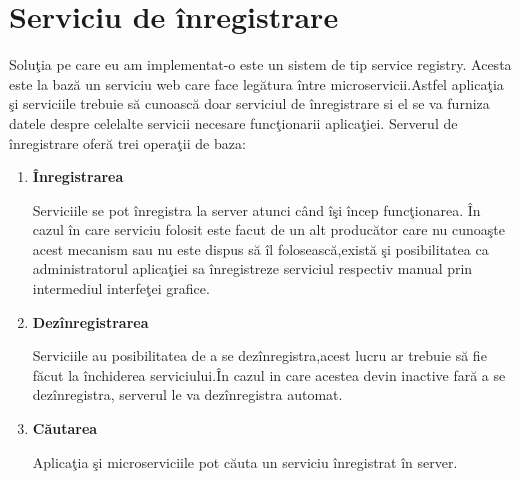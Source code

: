 \documentclass[a4paper,12pt]{report}
\begin{document}
\section{Serviciu de \^inregistrare}
Solu\c tia pe care eu am implementat-o este un sistem de tip service registry.
Acesta este la baz\u a un serviciu web care face leg\u atura \^intre microservicii.Astfel aplica\c tia \c si serviciile trebuie 
s\u a cunoasc\u a doar serviciul de \^inregistrare si el se va furniza datele despre celelalte servicii necesare func\c tionarii aplica\c tiei. 
Serverul de \^ inregistrare ofer\u a trei opera\c tii de baza:
\begin{enumerate}
	\item \textbf{\^Inregistrarea}
	
			Serviciile se pot \^inregistra la server atunci c\^and \^i\c si \^incep func\c tionarea.
			\^In cazul \^in care serviciu folosit este facut de un alt produc\u ator care nu cunoa\c ste acest 
			mecanism sau nu este dispus s\u a \^il foloseasc\u a,exist\u a \c si posibilitatea ca administratorul 
			aplica\c tiei sa \^inregistreze serviciul respectiv manual prin intermediul interfe\c tei grafice.
	\item \textbf{Dez\^inregistrarea}

		  Serviciile au posibilitatea de a se dez\^inregistra,acest lucru ar trebuie s\u a fie f\u acut la \^inchiderea 
		  serviciului.\^In cazul in care acestea devin inactive far\u a a se dez\^inregistra, serverul le va dez\^inregistra
		  automat.
	\item \textbf{C\u autarea}

		  Aplica\c tia \c si microserviciile pot c\u auta un serviciu \^inregistrat \^in server.
\end{enumerate}	
\end{document}
